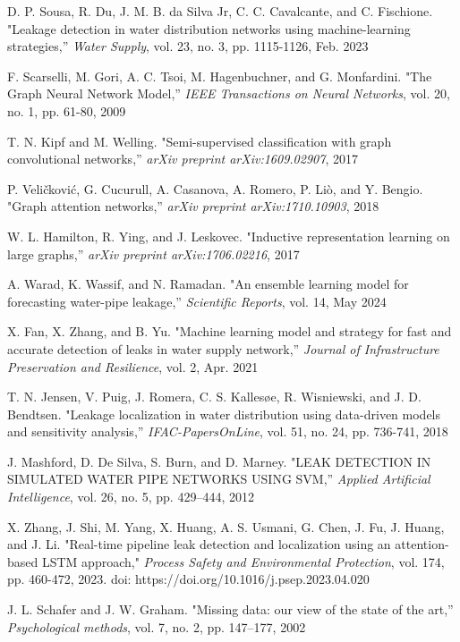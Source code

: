 \begin{thebibliography}{99}
D. P. Sousa, R. Du, J. M. B. da Silva Jr, C. C. Cavalcante, and C. Fischione. "Leakage detection in water distribution networks using machine-learning strategies,'' \textit{Water Supply}, vol. 23, no. 3, pp. 1115-1126, Feb. 2023

F. Scarselli, M. Gori, A. C. Tsoi, M. Hagenbuchner, and G. Monfardini. "The Graph Neural Network Model,'' \textit{IEEE Transactions on Neural Networks}, vol. 20, no. 1, pp. 61-80, 2009

T. N. Kipf and M. Welling. "Semi-supervised classification with graph convolutional networks,'' \textit{arXiv preprint arXiv:1609.02907}, 2017

P. Veličković, G. Cucurull, A. Casanova, A. Romero, P. Liò, and Y. Bengio. "Graph attention networks,'' \textit{arXiv preprint arXiv:1710.10903}, 2018

W. L. Hamilton, R. Ying, and J. Leskovec. "Inductive representation learning on large graphs,'' \textit{arXiv preprint arXiv:1706.02216}, 2017

A. Warad, K. Wassif, and N. Ramadan. "An ensemble learning model for forecasting water-pipe leakage,'' \textit{Scientific Reports}, vol. 14, May 2024

X. Fan, X. Zhang, and B. Yu. "Machine learning model and strategy for fast and accurate detection of leaks in water supply network,'' \textit{Journal of Infrastructure Preservation and Resilience}, vol. 2, Apr. 2021

T. N. Jensen, V. Puig, J. Romera, C. S. Kallesøe, R. Wisniewski, and J. D. Bendtsen. "Leakage localization in water distribution using data-driven models and sensitivity analysis,'' \textit{IFAC-PapersOnLine}, vol. 51, no. 24, pp. 736-741, 2018

J. Mashford, D. De Silva, S. Burn, and D. Marney. "LEAK DETECTION IN SIMULATED WATER PIPE NETWORKS USING SVM,'' \textit{Applied Artificial Intelligence}, vol. 26, no. 5, pp. 429--444, 2012

X. Zhang, J. Shi, M. Yang, X. Huang, A. S. Usmani, G. Chen, J. Fu, J. Huang, and J. Li. "Real-time pipeline leak detection and localization using an attention-based LSTM approach," \textit{Process Safety and Environmental Protection}, vol. 174, pp. 460-472, 2023. doi: https://doi.org/10.1016/j.psep.2023.04.020

J. L. Schafer and J. W. Graham. "Missing data: our view of the state of the art,'' \textit{Psychological methods}, vol. 7, no. 2, pp. 147--177, 2002


\end{thebibliography}
